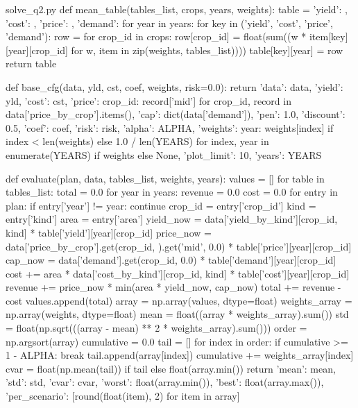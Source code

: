 \documentclass[bwprint]{gmcmthesis}
\begin{document}
\begin{appendices}
\begin{Python}{solve\_q2.py}
def mean_table(tables_list, crops, years, weights):
    table = {'yield': {}, 'cost': {}, 'price': {}, 'demand': {}}
    for year in years:
        for key in ('yield', 'cost', 'price', 'demand'):
            row = {}
            for crop_id in crops:
                row[crop_id] = float(sum((w * item[key][year][crop_id] for w, item in zip(weights, tables_list))))
            table[key][year] = row
    return table

def base_cfg(data, yld, cst, coef, weights, risk=0.0):
    return {'data': data, 'yield': yld, 'cost': cst, 'price': {crop_id: record['mid'] for crop_id, record in data['price_by_crop'].items()}, 'cap': dict(data['demand']), 'pen': 1.0, 'discount': 0.5, 'coef': coef, 'risk': risk, 'alpha': ALPHA, 'weights': {year: weights[index] if index < len(weights) else 1.0 / len(YEARS) for index, year in enumerate(YEARS)} if weights else None, 'plot_limit': 10, 'years': YEARS}

def evaluate(plan, data, tables_list, weights, years):
    values = []
    for table in tables_list:
        total = 0.0
        for year in years:
            revenue = 0.0
            cost = 0.0
            for entry in plan:
                if entry['year'] != year:
                    continue
                crop_id = entry['crop_id']
                kind = entry['kind']
                area = entry['area']
                yield_now = data['yield_by_kind'][crop_id, kind] * table['yield'][year][crop_id]
                price_now = data['price_by_crop'].get(crop_id, {}).get('mid', 0.0) * table['price'][year][crop_id]
                cap_now = data['demand'].get(crop_id, 0.0) * table['demand'][year][crop_id]
                cost += area * data['cost_by_kind'][crop_id, kind] * table['cost'][year][crop_id]
                revenue += price_now * min(area * yield_now, cap_now)
            total += revenue - cost
        values.append(total)
    array = np.array(values, dtype=float)
    weights_array = np.array(weights, dtype=float)
    mean = float((array * weights_array).sum())
    std = float(np.sqrt(((array - mean) ** 2 * weights_array).sum()))
    order = np.argsort(array)
    cumulative = 0.0
    tail = []
    for index in order:
        if cumulative >= 1 - ALPHA:
            break
        tail.append(array[index])
        cumulative += weights_array[index]
    cvar = float(np.mean(tail)) if tail else float(array.min())
    return {'mean': mean, 'std': std, 'cvar': cvar, 'worst': float(array.min()), 'best': float(array.max()), 'per_scenario': [round(float(item), 2) for item in array]}


\end{Python}
\end{appendices}
\end{document}
